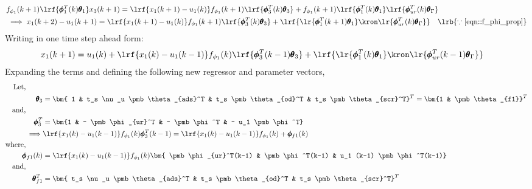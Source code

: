 \begin{align*}
      &f_{\phi_1}(k+1) \lrf{\pmb \phi_1^T(k) \pmb \theta_1} x_3(k+1)
                = \lrf{{x_1(k+1) - u_1(k)}} f_{\phi_1}(k+1)\lrf{\pmb \phi_3^T (k) \pmb \theta_3}
                + f_{\phi_1}(k+1)\lrf{\pmb \phi_1^T(k) \pmb \theta_1} \lrf{\pmb \phi^T_{ur}(k) \pmb \theta_\Gamma}\\
      &\implies {x_1(k+2) - u_1(k+1)} = \lrf{{x_1(k+1) - u_1(k)}} f_{\phi_1}(k+1)\lrf{\pmb \phi_3^T (k) \pmb \theta_3}
                + \lrf{ \lr{\pmb \phi_1^T(k+1) \pmb \theta_1} \kron \lr{\pmb \phi^T_{ur}(k) \pmb \theta_\Gamma}}
        \quad \lrb{\because \ref{eqn::f_phi_prop}}
\end{align*}
Writing in one time step ahead form:
\begin{align}
        x_1(k+1) &=  u_1(k)  +
                     \lrf{{x_1(k) - u_1(k-1)}} f_{\phi_1}(k)\lrf{\pmb \phi_3^T (k-1) \pmb \theta_3}+
                     \lrf{ \lr{\pmb \phi_1^T(k) \pmb \theta_1} \kron \lr{\pmb \phi^T_{ur}(k-1) \pmb \theta_\Gamma}}
        \label{eqn::r_nox_2}
\end{align}
Expanding the terms and defining the following new regressor and parameter vectors,
\begin{align*}
        \text{Let, } \qquad &\\
        \pmb \theta_3 &= \bm{ 1 &
                                t_s \nu_u \pmb \theta_{ads}^T &
                                t_s \pmb \theta_{od}^T        &
                                t_s \pmb \theta_{scr}^T} ^T
                        = \bm{1 & \pmb \theta_{f1}}^T\\
        \text{and, } \qquad &\\
        \pmb \phi_3^T &= \bm{1 &
                   - \pmb \phi_{ur}^T &
                   - \pmb \phi^T  &
                   - u_1 \pmb \phi^T}   \\
        \implies &\lrf{{x_1(k) - u_1(k-1)}} f_{\phi_1}(k) \pmb \phi_3^T (k-1)  = \lrf{{x_1(k) - u_1(k-1)}} f_{\phi_1}(k) + \pmb \phi_{f1}(k)\\
        \text{where, } \qquad &\\
        \pmb \phi_{f1}(k)
                &= \lrf{{x_1(k) - u_1(k-1)}} f_{\phi_1}(k)
                \bm{ \pmb \phi_{ur}^T(k-1) &
                    \pmb \phi^T(k-1)  &
                    u_1 (k-1) \pmb \phi^T(k-1)}   \\
        \text{and, } \qquad &\\
        \pmb \theta_{f1}^T &= \bm{ t_s \nu_u \pmb \theta_{ads}^T &
                                t_s \pmb \theta_{od}^T        &
                                t_s \pmb \theta_{scr}^T} ^T
\end{align*}
